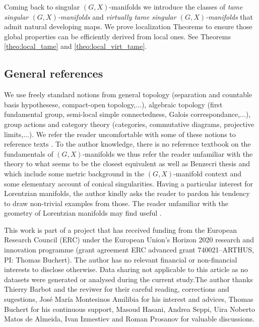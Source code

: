 Coming back to singular $(G,X)$-manifolds we introduce the classes of {\it tame singular $(G,X)$-manifolds} and {\it virtually tame singular $(G,X)$-manifolds} that admit natural developing maps.  We prove localization Theorems to ensure those global properties can be efficiently derived from local ones. See Theorems \ref{theo:local_tame} and \ref{theo:local_virt_tame}.

\subsection{General references}
We use freely standard notions from general topology (separation and countable basis hypothesese, compact-open topology,...), algebraic topology (first fundamental group, semi-local simple connectedness, Galois correspondance,...), group actions and category theory (categories, commutative diagrams, projective limits,...). We refer the reader uncomfortable with some of these notions to reference texts \cite{MR2048350,bourbaki2013general,steen1978counterexamples,MR1700700,hatcher2005algebraic,MR1712872}. To the author knowledge, there is no reference textbook on the fundamentals of $(G,X)$-manifolds we thus refer the reader unfamiliar with the theory to what seems to be the closest equivalent \cite{MR957518} as well as 
Benzecri thesis \cite{Benzecri1960VaritsLA} and \cite{MR1299730,MR2522946}  which include some metric background in the $(G,X)$-manifold context and some elementary account of conical singularities. Having a particular interest for Lorentzian manifolds, the author kindly asks the reader to pardon his tendency to draw non-trivial examples from those. The reader unfamiliar with the geometry of Lorentzian manifolds may find useful \cite{oneil,barbot2010algebre}.


\begin{acknowledgements}
This work is part of a project that has received funding from the European Research Council (ERC) under the European Union's Horizon 2020 research and innovation programme (grant agreement ERC advanced grant 740021--ARTHUS, PI: Thomas Buchert). 
The author has no relevant financial or non-financial interests to disclose otherwise.
Data sharing not applicable to this article as no datasets were generated or analysed during the current study.The author thanks Thierry Barbot and the reviwer for their careful reading, corrections and sugestions, José María Montesinos Amilibia for his interest and advices,  Thomas Buchert for his continuous support,  Masoud Hasani, Andrea Seppi, Uira Noberto Matos de Almeida,  Ivan Izmestiev and Roman Prosanov for valuable discussions.
\end{acknowledgements}



